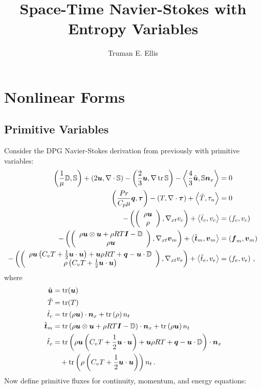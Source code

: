 \documentclass{article}
\title{Space-Time Navier-Stokes with Entropy Variables}
\author{Truman E. Ellis}
\begin{document}
\maketitle

\section*{Nonlinear Forms}
\subsection*{Primitive Variables}
Consider the DPG Navier-Stokes derivation from previously with primitive variables:
\begin{subequations}
\label{eq:compressibleNSBF}
\begin{align}
	\LRp{\frac{1}{\mu}\mathbb{D},\mathbb{S}}+\LRp{2\bfu,\Div\mathbb{S}}-\LRp{\frac{2}{3}\bfu,\Grad\trace{\mathbb{S}}}
	-\LRa{\frac{4}{3}\hat\bfu,\mathbb{S}\bfn_x}&=0\\
	\LRp{\frac{Pr}{C_p\mu}\bfq,\bftau}-\LRp{T,\Div\bftau}+\LRa{\hat T,\tau_n}&=0\\
	-\LRp{\vecttwo{\rho\bfu}{\rho},\Gradxt v_c}+\LRa{\hat t_c,v_c}&=\LRp{f_c,v_c}\\
	-\LRp{\vecttwo{\rho\bfu\otimes\bfu+\rho RT\bfI-\mathbb{D}}{\rho\bfu},\Gradxt\bfv_m}+\LRa{\hat\bft_m,\bfv_m}&=\LRp{\bff_m,\bfv_m}\\
	-\LRp{\vecttwo{\rho\bfu\LRp{C_v T+\frac{1}{2}\bfu\cdot\bfu}+\bfu\rho RT+\bfq-\bfu\cdot\mathbb{D}}{\rho\LRp{C_v T+\frac{1}{2}\bfu\cdot\bfu}},\Gradxt v_e}
	+\LRa{\hat t_e,v_e}&=\LRp{f_e,v_e}\,,
\end{align}
\end{subequations}
where 
\begin{equation*}
\begin{aligned}
\hat\bfu&=\trace(\bfu)\\
\hat T&=\trace(T)\\
\hat t_c&=\trace\LRp{\rho\bfu}\cdot\bfn_x
+\trace\LRp{\rho}n_t\\
\hat\bft_m&=\trace\LRp{\rho\bfu\otimes\bfu+\rho RT\bfI-\mathbb{D}}\cdot\bfn_x
+\trace\LRp{\rho\bfu} n_t\\
\hat t_e&=\trace\LRp{\rho\bfu\LRp{C_v T+\frac{1}{2}\bfu\cdot\bfu}+\bfu\rho RT+\bfq-\bfu\cdot\mathbb{D}}\cdot\bfn_x\\
&\quad+\trace\LRp{\rho\LRp{C_v T+\frac{1}{2}\bfu\cdot\bfu}}n_t\,.
\end{aligned}
\end{equation*}
Now define primitive fluxes for continuity, momentum, and energy equations:
\end{document}
